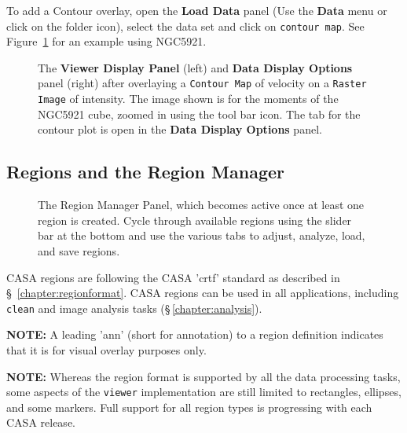 To add a Contour overlay, open the {\bf Load Data} panel (Use the {\bf Data}
menu or click on the folder icon), select the data set and click on
{\tt contour map}. See Figure~\ref{fig:viewer_rascon} for an example using NGC5921.

\begin{figure}[h!]
\begin{center}
\caption{\label{fig:viewer_rascon} The {\bf Viewer Display Panel}
(left) and {\bf Data Display Options} panel (right) after overlaying
a {\tt Contour Map} of velocity on a {\tt Raster Image} of intensity.  The
image shown is for the moments of the NGC5921 cube, zoomed in using the tool bar icon.
The tab for the contour plot is open in the {\bf Data Display Options} 
panel.} 
\hrulefill
\end{center}
\end{figure}



\subsection{Regions and the Region Manager}
\label{section:display.image.region}

\begin{figure}[h!]
\begin{center}
\caption{\label{fig:viewer_regionpanel} The Region Manager Panel, 
which becomes active once at least one region is created. Cycle through 
available regions using the slider bar at the bottom and use the various tabs
to adjust, analyze, load, and save regions.}
\hrulefill
\end{center}
\end{figure}

CASA regions are following the CASA 'crtf' standard as described in
\S~\ref{chapter:regionformat}. CASA regions can be used in all
applications, including {\tt clean} and image analysis tasks
(\S\,\ref{chapter:analysis}).

{\bf NOTE:} A leading 'ann' (short for annotation) to a
region definition indicates that it is for visual overlay purposes
only.

{\bf NOTE:} Whereas the region format is supported by all the data
processing tasks, some aspects of the {\tt viewer} implementation are still limited
to rectangles, ellipses, and some markers. Full support for all region types
is progressing with each CASA release. 

